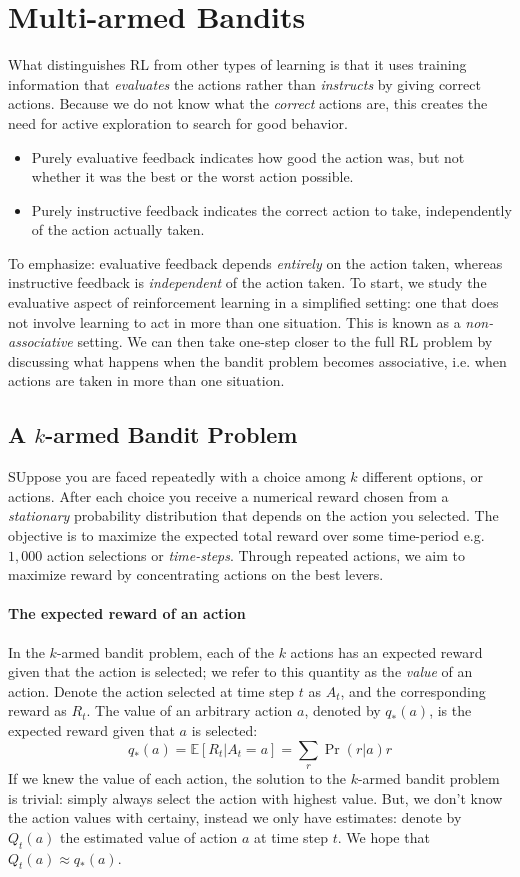 \documentclass[12pt]{article}
\begin{document}
\section{Multi-armed Bandits}
What distinguishes RL from other types of learning is that it uses training information that \emph{evaluates} the actions rather than \emph{instructs} by giving correct actions. Because we do not know what the \emph{correct} actions are, this creates the need for active exploration to search for good behavior.
\begin{itemize}
\item Purely evaluative feedback indicates how good the action was, but not   whether it was the best or the worst action possible.
\item Purely instructive feedback indicates the correct action to take, independently of the action actually taken.
\end{itemize}
To emphasize: evaluative feedback depends \emph{entirely} on the action taken, whereas instructive feedback is \emph{independent} of the action taken.
To start, we study the evaluative aspect of reinforcement learning in a simplified setting: one that does not involve learning to act in more than one situation. This is known as a \emph{non-associative} setting. We can then take one-step closer to the full RL problem by discussing what happens when the bandit problem becomes associative, i.e. when actions are taken in more than one situation.

\subsection{A $k$-armed Bandit Problem}
SUppose you are faced repeatedly with a choice among $k$ different options, or actions. After each choice you receive a numerical reward chosen from a \emph{stationary} probability distribution that depends on the action you selected. The objective is to maximize the expected total reward over some time-period e.g. $1,000$ action selections or \emph{time-steps}. Through repeated actions, we aim to maximize reward by concentrating actions on the best levers.

\paragraph{The expected reward of an action} In the $k$-armed bandit problem, each of the $k$ actions has an expected reward given that the action is selected; we refer to this quantity as the \emph{value} of an action. Denote the action selected at time step $t$ as $A_t$, and the corresponding reward as $R_t$. The value of an arbitrary action $a$, denoted by $q_*(a)$, is the expected reward given that $a$ is selected:
\[
  q_*(a) = \mathbb E \left[ R_t | A_t = a \right] = \sum_{r} \Pr(r|a) r
\]
If we knew the value of each action, the solution to the $k$-armed bandit problem is trivial: simply always select the action with highest value. But, we don't know the action values with certainy, instead we only have estimates: denote by $Q_t(a)$ the estimated value of action $a$ at time step $t$. We hope that $Q_t(a) \approx q_*(a)$.
\end{document}
